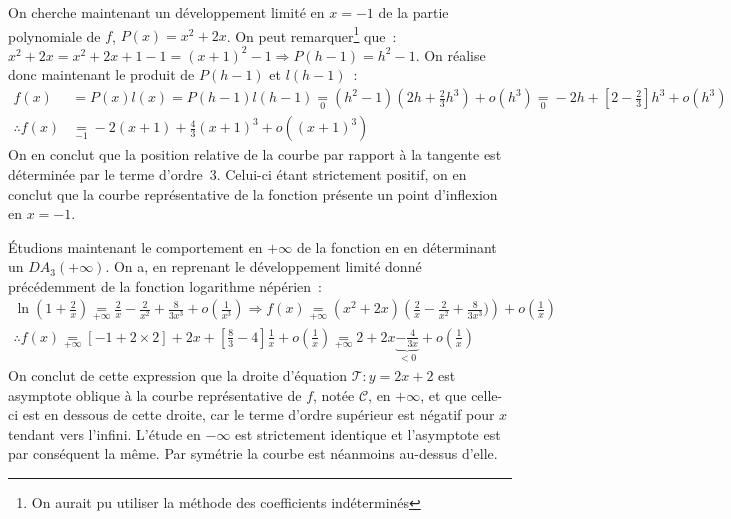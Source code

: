 \documentclass{article}
\newcommand{\oo}[1]{+ o\!\left(#1\right)}
\begin{document}
  On cherche maintenant un développement limité en $x = -1$ de la partie polynomiale de $f$, $P(x) = x^2 + 2x$. On peut remarquer\footnote{On aurait pu utiliser la méthode des coefficients indéterminés} que~: $x^2 + 2x = x^2 + 2x + 1 - 1 = \left(x + 1\right)^2 - 1 \Longrightarrow P(h - 1) = h^2 - 1$. On réalise donc maintenant le produit de $P(h - 1)$ et $l(h - 1)$~:
  \begin{align*}
    f(x) &= P(x)l(x) = P(h - 1)l(h - 1) \underset{0}{=} (h^2 - 1)\left(2h + \frac{2}{3}h^3\right) \oo{h^3}
    \underset{0}{=} -2h + \left[2 - \frac{2}{3}\right]h^3 \oo{h^3} \\
    \therefore f(x) &\underset{-1}{=} -2(x + 1) + \frac{4}{3}(x + 1)^3 \oo{(x + 1)^3}
  \end{align*}
  On en conclut que la position relative de la courbe par rapport à la tangente est déterminée par le terme d'ordre~3. Celui-ci étant strictement positif, on en conclut que la courbe représentative de la fonction présente un point d'inflexion en $x = -1$.

  Étudions maintenant le comportement en $+\infty$ de la fonction en en déterminant un $DA_3(+\infty)$. On a, en reprenant le développement limité donné précédemment de la fonction logarithme népérien~:
  \begin{align*}
    \ln\left(1 + \frac{2}{x}\right) \underset{+\infty}{=} \frac{2}{x} - \frac{2}{x^2} + \frac{8}{3x^3} \oo{\frac{1}{x^3}}
    \Longrightarrow f(x) \underset{+\infty}{=} (x^2 + 2x)\left(\frac{2}{x} - \frac{2}{x^2} + \frac{8}{3x^3})\right) \oo{\frac{1}{x}} \\
    \therefore f(x) \underset{+\infty}{=} [-1 + 2 \times 2] + 2x + \left[\frac{8}{3} - 4\right]\frac{1}{x} \oo{\frac{1}{x}} \underset{+\infty}{=} 2 + 2x \underbrace{- \frac{4}{3x}}_{<0} \oo{\frac{1}{x}}
  \end{align*}
  On conclut de cette expression que la droite d'équation $\mathscr{T}\colon y = 2x + 2$ est asymptote oblique à la courbe représentative de $f$, notée $\mathscr{C}$, en $+\infty$, et que celle-ci est en dessous de cette droite, car le terme d'ordre supérieur est négatif pour $x$ tendant vers l'infini. L'étude en $-\infty$ est strictement identique et l'asymptote est par conséquent la même. Par symétrie la courbe est néanmoins au-dessus d'elle.
\end{document}
